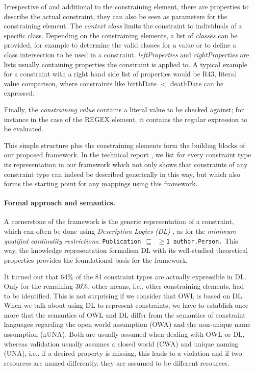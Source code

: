 \documentclass[a4paper,fontsize=11pt]{scrartcl}
\newcommand{\ms}[1]{\texttt{#1}}
\begin{document}
Irrespective of and additional to the constraining element, there are properties to describe the actual constraint, they can also be seen as parameters for the constraining element. The \emph{context class} limits the constraint to individuals of a specific class. Depending on the constraining elements, a list of \emph{classes} can be provided, for example to determine the valid classes for a value or to define a class intersection to be used in a constraint. \emph{leftProperties} and \emph{rightProperties} are lists usually containing properties the constraint is applied to. A typical example for a constraint with a right hand side list of properties would be R43, literal value comparison, where constraints like birthDate $<$ deathDate can be expressed.

Finally, the \emph{constraining value} contains a literal value to be checked against; for instance in the case of the REGEX element, it contains the regular expression to be evaluated.

This simple structure plus the constraining elements form the building blocks of our proposed framework. In the technical report \cite{BoschNolleAcarEckert2015}, we list for every constraint type its representation in our framework which not only shows that constraints of any constraint type can indeed be described generically in this way, but which also forms the starting point for any mappings using this framework.

\paragraph{Formal approach and semantics.}

A cornerstone of the framework is the generic representation of a constraint, which can often be done using \emph{Description Logics (DL)} \cite{Kroetzsch2012,Baader-2003,Baader-Nutt-2003}, as for the \emph{minimum qualified cardinality restrictions}: {\small\ms{Publication $\sqsubseteq$ $\geq$1 author.Person.}}  This way, the knowledge representation formalism DL with its well-studied theoretical properties provides the foundational basis for the framework.

It turned out that 64\% of the 81 constraint types are actually expressible in DL. Only for the remaining 36\%, other means, i.e., other constraining elements, had to be identified. This is not surprising if we consider that OWL is based on DL. When we talk about using DL to represent constraints, we have to establish once more that the semantics of OWL and DL differ from the semantics of constraint languages regarding the open world assumption (OWA) and the non-unique name assumption (nUNA). Both are usually assumed when dealing with OWL or DL, whereas validation usually assumes a closed world (CWA) and unique naming (UNA), i.e., if a desired property is missing, this leads to a violation and if two resources are named differently, they are assumed to be different resources. 
\end{document}
